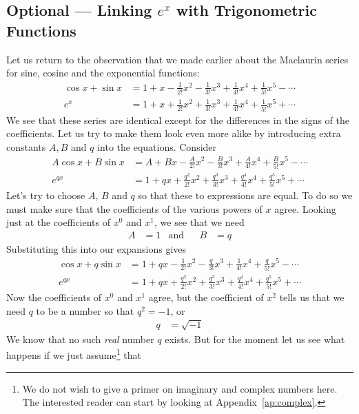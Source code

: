\subsection{Optional --- Linking $e^x$ with Trigonometric Functions}
\label{sec:Euler}

Let us return to the observation that we made earlier about the Maclaurin series for sine, cosine and the exponential
functions:
\begin{align*}
  \cos x + \sin x
  &= 1 + x - \frac{1}{2!}x^2 - \frac{1}{3!}x^3 + \frac{1}{4!}x^4 + \frac{1}{5!}x^5 - \cdots\\
  e^x
  &= 1 + x + \frac{1}{2!}x^2 + \frac{1}{3!}x^3 + \frac{1}{4!}x^4 + \frac{1}{5!}x^5 + \cdots
\end{align*}
We see that these series are identical except for the differences in the
signs of the coefficients.
Let us try to make them look even more alike by introducing extra constants
$A, B$ and $q$ into the equations. Consider
\begin{align*}
  A \cos x + B \sin x
  &= A + Bx - \frac{A}{2!}x^2 - \frac{B}{3!}x^3 + \frac{A}{4!}x^4 + \frac{B}{5!}x^5 - \cdots\\
  e^{q x}
  &= 1 + qx + \frac{q^2}{2!}x^2 + \frac{q^3}{3!}x^3 + \frac{q^4}{4!}x^4 + \frac{q^5}{5!}x^5 + \cdots
\end{align*}
Let's try to choose $A$, $B$ and $q$ so that these to expressions are equal.
To do so we must make sure that the coefficients of the various powers of
$x$ agree. Looking just at the coefficients of $x^0$ and $x^1$, we see
that we need
\begin{align*}
  A&=1 & \text{and}&& B&=q
\end{align*}
Substituting this into our expansions gives
\begin{align*}
  \cos x + q\sin x
  &= 1 + qx - \frac{1}{2!}x^2 - \frac{q}{3!}x^3 + \frac{1}{4!}x^4 + \frac{q}{5!}x^5 - \cdots\\
  e^{q x}
  &= 1 + qx + \frac{q^2}{2!}x^2 + \frac{q^3}{3!}x^3 + \frac{q^4}{4!}x^4 + \frac{q^5}{5!}x^5 + \cdots
\end{align*}
Now the coefficients of $x^0$ and $x^1$ agree, but the coefficient of $x^2$ tells us that we need $q$ to be a number so
that $q^2 =-1$, or
\begin{align*}
  q &= \sqrt{-1}
\end{align*}
We know that no such \emph{real} number $q$ exists. But for the moment
let us see what happens if we just assume\footnote{We do not wish to give a primer on imaginary and complex numbers here. The interested reader can start by looking at Appendix~\ref{ap:complex}.} that
